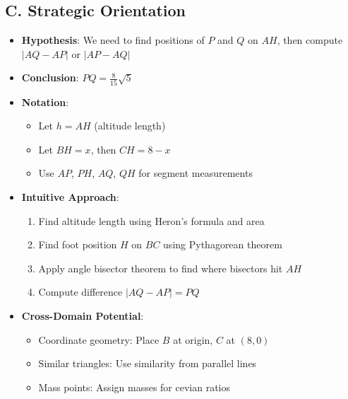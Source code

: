 \documentclass[12pt]{article}
\begin{document}
\begin{problemconfigbox}
\subsection*{C. Strategic Orientation}
\begin{itemize}[leftmargin=*]
    \item \textbf{Hypothesis}: We need to find positions of $P$ and $Q$ on $AH$, then compute $|AQ - AP|$ or $|AP - AQ|$
    \item \textbf{Conclusion}: $PQ = \frac{8}{15}\sqrt{5}$
    \item \textbf{Notation}: 
    \begin{itemize}
        \item Let $h = AH$ (altitude length)
        \item Let $BH = x$, then $CH = 8-x$
        \item Use $AP$, $PH$, $AQ$, $QH$ for segment measurements
    \end{itemize}
    \item \textbf{Intuitive Approach}: 
    \begin{enumerate}
        \item Find altitude length using Heron's formula and area
        \item Find foot position $H$ on $BC$ using Pythagorean theorem
        \item Apply angle bisector theorem to find where bisectors hit $AH$
        \item Compute difference $|AQ - AP| = PQ$
    \end{enumerate}
    \item \textbf{Cross-Domain Potential}: 
    \begin{itemize}
        \item Coordinate geometry: Place $B$ at origin, $C$ at $(8,0)$
        \item Similar triangles: Use similarity from parallel lines
        \item Mass points: Assign masses for cevian ratios
    \end{itemize}
\end{itemize}
\end{problemconfigbox}
\end{document}
